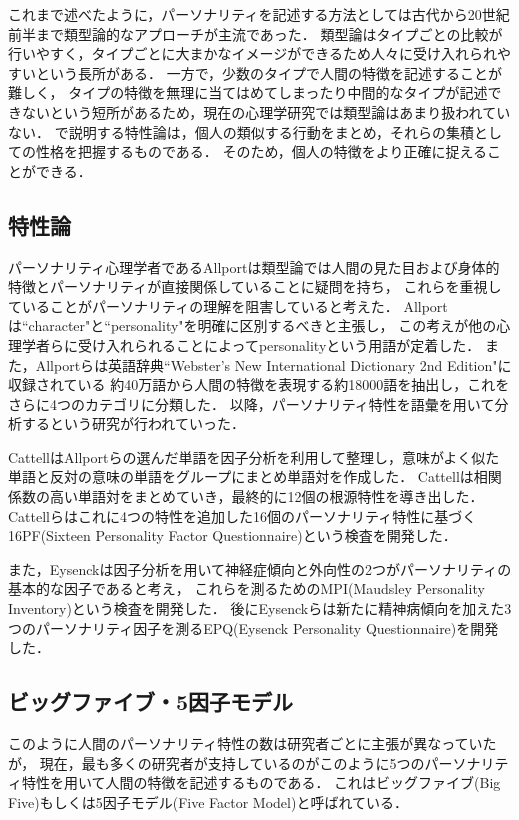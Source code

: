 これまで述べたように，パーソナリティを記述する方法としては古代から20世紀前半まで類型論的なアプローチが主流であった．
類型論はタイプごとの比較が行いやすく，タイプごとに大まかなイメージができるため人々に受け入れられやすいという長所がある．
一方で，少数のタイプで人間の特徴を記述することが難しく，
タイプの特徴を無理に当てはめてしまったり中間的なタイプが記述できないという短所があるため，現在の心理学研究では類型論はあまり扱われていない．
で説明する特性論は，個人の類似する行動をまとめ，それらの集積としての性格を把握するものである．
そのため，個人の特徴をより正確に捉えることができる．

\subsection{特性論}
\label{sec:trait}
パーソナリティ心理学者であるAllportは類型論では人間の見た目および身体的特徴とパーソナリティが直接関係していることに疑問を持ち，
これらを重視していることがパーソナリティの理解を阻害していると考えた．
Allport\cite{allport}は``character"と``personality"を明確に区別するべきと主張し，
この考えが他の心理学者らに受け入れられることによってpersonalityという用語が定着した．
また，Allportら\cite{allport_odbert}は英語辞典``Webster's New International Dictionary 2nd Edition"に収録されている
約40万語から人間の特徴を表現する約18000語を抽出し，これをさらに4つのカテゴリに分類した．
以降，パーソナリティ特性を語彙を用いて分析するという研究が行われていった．

Cattell\cite{cattell}はAllportらの選んだ単語を因子分析を利用して整理し，意味がよく似た単語と反対の意味の単語をグループにまとめ単語対を作成した．
Cattellは相関係数の高い単語対をまとめていき，最終的に12個の根源特性を導き出した．
Cattellら\cite{16pf}はこれに4つの特性を追加した16個のパーソナリティ特性に基づく16PF(Sixteen Personality Factor Questionnaire)という検査を開発した．

また，Eysenck\cite{mpi}は因子分析を用いて神経症傾向と外向性の2つがパーソナリティの基本的な因子であると考え，
これらを測るためのMPI(Maudsley Personality Inventory)という検査を開発した．
後にEysenckら\cite{epq}は新たに精神病傾向を加えた3つのパーソナリティ因子を測るEPQ(Eysenck Personality Questionnaire)を開発した．

\subsection{ビッグファイブ・5因子モデル}
このように人間のパーソナリティ特性の数は研究者ごとに主張が異なっていたが，
現在，最も多くの研究者が支持しているのがこのように5つのパーソナリティ特性を用いて人間の特徴を記述するものである．
これはビッグファイブ(Big Five)もしくは5因子モデル(Five Factor Model)と呼ばれている．

